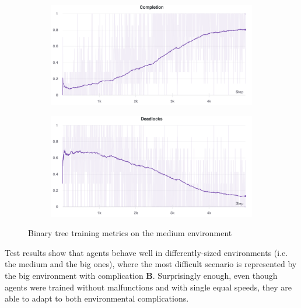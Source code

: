 \documentclass[a4paper,10pt]{report}
\begin{document}
\begin{figure}[h]
	\medskip
	\begin{subfigure}{0.48\textwidth}
	\includegraphics[width=\linewidth]{bt-medium-completions.png}
	\end{subfigure}\hspace*{\fill}
	\begin{subfigure}{0.48\textwidth}
	\includegraphics[width=\linewidth]{bt-medium-deadlocks.png}
	\end{subfigure}
	
	\caption{Binary tree training metrics on the medium environment}
	\label{fig:bt-medium-metrics}
\end{figure}
\clearpage

Test results show that agents behave well in differently-sized environments (i.e. the medium and the big ones), where the most difficult scenario is represented by the big environment with complication \textbf{B}. Surprisingly enough, even though agents were trained without malfunctions and with single equal speeds, they are able to adapt to both environmental complications. 
\end{document}
